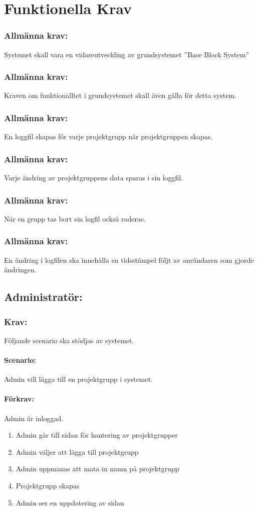 \documentclass[paper=a4, fontsize=11pt,twoside]{article}
\begin{document}
\section{Funktionella Krav}

\subsubsection{Allmänna krav:}
Systemet skall vara en vidareutveckling av grundsystemet ''Base Block System''
\subsubsection{Allmänna krav:}
Kraven om funktionalltet i grundsystemet skall även gälla för detta system.
\subsubsection{Allmänna krav:}
En loggfil skapas för varje projektgrupp när projektgruppen skapas.
\subsubsection{Allmänna krav:}
Varje ändring av projektgruppens data sparas i sin loggfil.
\subsubsection{Allmänna krav:}
När en grupp tas bort sin logfil också raderas.
\subsubsection{Allmänna krav:}
En ändring i logfilen ska innehålla en tidsstämpel följt av användaren som gjorde ändringen.

\subsection{Administratör:}

\subsubsection{Krav:} Följande scenario ska stödjas av systemet.
\paragraph{Scenario:}
Admin vill lägga till en projektgrupp i systemet.
\paragraph{Förkrav:}
Admin är inloggad.
\begin{enumerate}
\item Admin går till sidan för hantering av projektgrupper
\item Admin väljer att lägga till projektgrupp
\item Admin uppmanas att mata in namn på projektgrupp
\item Projektgrupp skapas
\item Admin ser en uppdatering av sidan
\end{enumerate}
\end{document}
